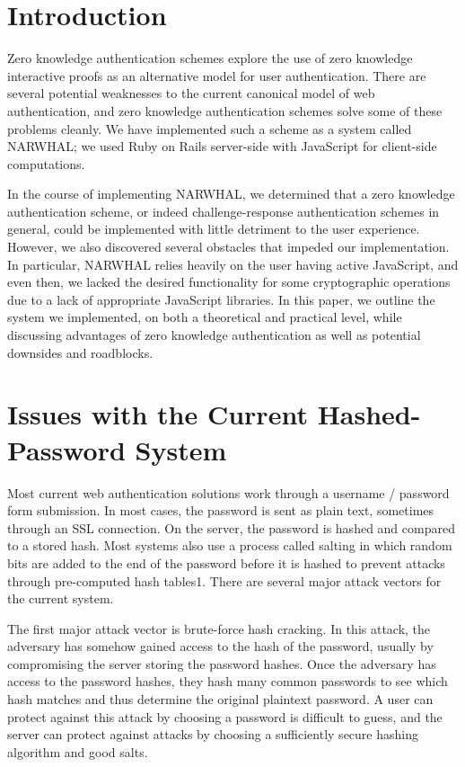\documentclass[11pt]{article}
\begin{document}
\section{Introduction}

Zero knowledge authentication schemes explore the use of zero knowledge interactive proofs as an alternative model for user authentication.  There are several potential weaknesses to the current canonical model of web authentication, and zero knowledge authentication schemes solve some of these problems cleanly.  We have implemented such a scheme as a system called NARWHAL; we used Ruby on Rails server-side with JavaScript for client-side computations.

In the course of implementing NARWHAL, we determined that a zero knowledge authentication scheme, or indeed challenge-response authentication schemes in general, could be implemented with little detriment to the user experience.  However, we also discovered several obstacles that impeded our implementation.  In particular, NARWHAL relies heavily on the user having active JavaScript, and even then, we lacked the desired functionality for some cryptographic operations due to a lack of appropriate JavaScript libraries.  In this paper, we outline the system we implemented, on both a theoretical and practical level, while discussing advantages of zero knowledge authentication as well as potential downsides and roadblocks.


\section{Issues with the Current Hashed-Password System}

Most current web authentication solutions work through a username / password form submission.  In most cases, the password is sent as plain text, sometimes through an SSL connection.  On the server, the password is hashed and compared to a stored hash.  Most systems also use a process called salting in which random bits are added to the end of the password before it is hashed to prevent attacks through pre-computed hash tables1.  There are several major attack vectors for the current system.

The first major attack vector is brute-force hash cracking.  In this attack, the adversary has somehow gained access to the hash of the password, usually by compromising the server storing the password hashes.  Once the adversary has access to the password hashes, they hash many common passwords to see which hash matches and thus determine the original plaintext password.  A user can protect against this attack by choosing a password is difficult to guess, and the server can protect against attacks by choosing a sufficiently secure hashing algorithm and good salts.
\end{document}
